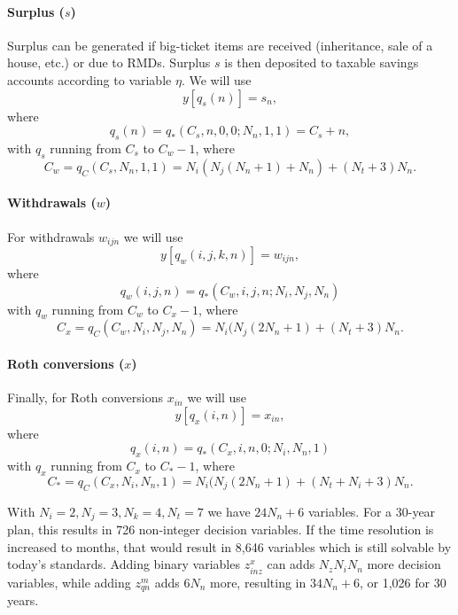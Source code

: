 \documentclass{report}[fleqn,11pt]
\begin{document}
\paragraph*{Surplus (\boldmath$s$)}
Surplus can be generated if big-ticket items are received (inheritance, sale of a house, etc.)
or due to RMDs. Surplus $s$ is then deposited to taxable savings accounts according
to variable $\eta$. We will use
\begin{equation}
	y[q_s(n)] = s_{n},
\end{equation}
where
\begin{equation}
	q_s(n) = q_*(C_s, n, 0, 0; N_n, 1, 1) = C_s + n,
\end{equation}
with $q_s$ running from $C_s$ to $C_w - 1$, where
\[
	C_w = q_C(C_s, N_n, 1, 1) = N_i(N_j(N_n+1) + N_n) + (N_t + 3) N_n.
\]

\paragraph*{Withdrawals (\boldmath$w$)}
For withdrawals $w_{ijn}$ we will use
\begin{equation}
	y[q_w(i, j, k, n)] = w_{i j n},
\end{equation}
where
\begin{equation}
	q_w(i, j, n) = q_*(C_w, i, j, n; N_i, N_j, N_n)
\end{equation}
with $q_w$ running from $C_w$ to $C_x - 1$, where
\[
	C_x = q_C(C_w, N_i, N_j, N_n) = N_i(N_j(2N_n + 1) + (N_t + 3) N_n.
\]

\paragraph*{Roth conversions (\boldmath$x$)}
Finally, for Roth conversions $x_{in}$ we will use
\begin{equation}
	y[q_x(i, n)] = x_{i n},
\end{equation}
where
\begin{equation}
	q_x(i, n) = q_*(C_x, i, n, 0; N_i, N_n, 1)
\end{equation}
with $q_x$ running from $C_x$ to $C_* - 1$, where
\begin{equation}
	\label{Eq:Cstar}
	C_* = q_C(C_x, N_i, N_n, 1) = N_i(N_j(2N_n + 1) + (N_t + N_i + 3) N_n.
\end{equation}

With $N_i = 2, N_j = 3, N_k = 4, N_t = 7$ we have $24 N_n + 6$ variables. For
a 30-year plan, this results in 726 non-integer decision variables.
If the time resolution is increased to
months, that would result in 8,646 variables which is still solvable by today's standards.
Adding binary variables $z^x_{inz}$ can adds $N_zN_iN_n$ more decision variables,
while adding $z^m_{qn}$ adds $6N_n$ more, resulting in $34 N_n + 6$, or 1,026 for 30 years.
\end{document}
